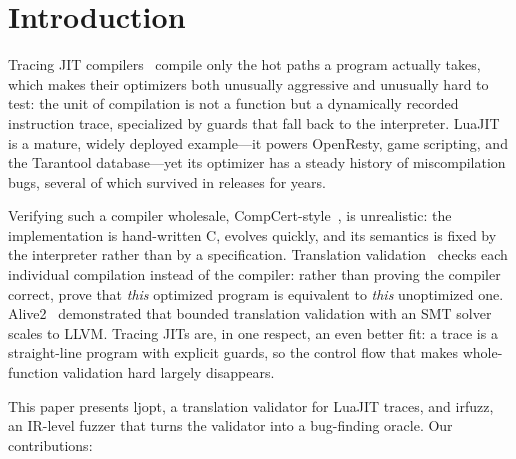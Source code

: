 \documentclass[runningheads]{llncs}
\newcommand{\full}[1]{#1}
\newcommand{\brief}[1]{}
\newcommand{\full}[1]{}
\newcommand{\brief}[1]{#1}
\newcommand{\ljopt}{\textsf{ljopt}}
\newcommand{\irfuzz}{\textsf{irfuzz}}
\begin{document}
\section{Introduction}

Tracing JIT compilers~\cite{gal2009tracemonkey,bolz2009pypy} compile only the
hot paths a program actually takes, which makes their optimizers both
unusually aggressive and unusually hard to test: the unit of compilation is
not a function but a dynamically recorded instruction trace, specialized by
guards that fall back to the interpreter. LuaJIT~\cite{pall2005luajit} is a
mature, widely deployed example---it powers OpenResty, game scripting, and
the Tarantool database---yet its optimizer has a steady history of
miscompilation bugs, several of which survived in releases for years.

\full{Verifying such a compiler wholesale,
CompCert-style~\cite{leroy2009compcert}, is unrealistic: the implementation
is hand-written C, evolves quickly, and its semantics is fixed by the
interpreter rather than by a specification.
}%
Translation validation~\cite{pnueli1998tv,necula2000tv} checks each
individual compilation instead of the compiler: rather than proving the
compiler correct, prove that \emph{this} optimized program is equivalent to
\emph{this} unoptimized one.
\full{Alive2~\cite{lopes2021alive2} demonstrated that bounded translation
validation with an SMT solver scales to LLVM. }%
\brief{Alive2~\cite{lopes2021alive2} made this practical for LLVM. }%
Tracing JITs are\full{, in one respect, an even better fit}\brief{ a natural
fit}: a trace is a straight-line program with explicit guards, so the
control flow that makes whole-function validation hard largely disappears.

This paper presents \ljopt{}, a translation validator for LuaJIT traces, and
\irfuzz{}, an IR-level fuzzer that turns the validator into a bug-finding
oracle. Our contributions:
\end{document}
